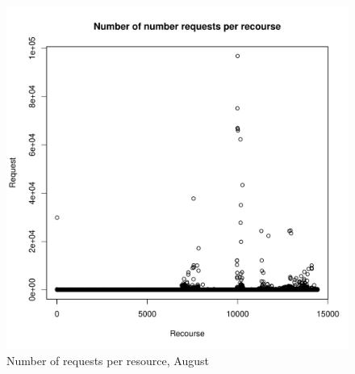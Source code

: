 \documentclass[english]{article}
\begin{document}
\begin{figure}[H]
\centerline{\includegraphics{Weblogs/Aug/NumberOfNumberRequestsPerRecourse.pdf}}
\caption{Number of requests per resource, August}
\end{figure}
\end{document}
